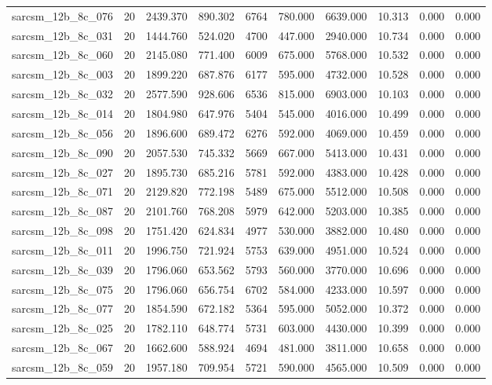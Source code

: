 \begin{tabular}{lrrrrrrrrr}
sarcsm\_12b\_8c\_076 & 20 & 2439.370 & 890.302 & 6764 & 780.000 & 6639.000 & 10.313 & 0.000 & 0.000 \\
sarcsm\_12b\_8c\_031 & 20 & 1444.760 & 524.020 & 4700 & 447.000 & 2940.000 & 10.734 & 0.000 & 0.000 \\
sarcsm\_12b\_8c\_060 & 20 & 2145.080 & 771.400 & 6009 & 675.000 & 5768.000 & 10.532 & 0.000 & 0.000 \\
sarcsm\_12b\_8c\_003 & 20 & 1899.220 & 687.876 & 6177 & 595.000 & 4732.000 & 10.528 & 0.000 & 0.000 \\
sarcsm\_12b\_8c\_032 & 20 & 2577.590 & 928.606 & 6536 & 815.000 & 6903.000 & 10.103 & 0.000 & 0.000 \\
sarcsm\_12b\_8c\_014 & 20 & 1804.980 & 647.976 & 5404 & 545.000 & 4016.000 & 10.499 & 0.000 & 0.000 \\
sarcsm\_12b\_8c\_056 & 20 & 1896.600 & 689.472 & 6276 & 592.000 & 4069.000 & 10.459 & 0.000 & 0.000 \\
sarcsm\_12b\_8c\_090 & 20 & 2057.530 & 745.332 & 5669 & 667.000 & 5413.000 & 10.431 & 0.000 & 0.000 \\
sarcsm\_12b\_8c\_027 & 20 & 1895.730 & 685.216 & 5781 & 592.000 & 4383.000 & 10.428 & 0.000 & 0.000 \\
sarcsm\_12b\_8c\_071 & 20 & 2129.820 & 772.198 & 5489 & 675.000 & 5512.000 & 10.508 & 0.000 & 0.000 \\
sarcsm\_12b\_8c\_087 & 20 & 2101.760 & 768.208 & 5979 & 642.000 & 5203.000 & 10.385 & 0.000 & 0.000 \\
sarcsm\_12b\_8c\_098 & 20 & 1751.420 & 624.834 & 4977 & 530.000 & 3882.000 & 10.480 & 0.000 & 0.000 \\
sarcsm\_12b\_8c\_011 & 20 & 1996.750 & 721.924 & 5753 & 639.000 & 4951.000 & 10.524 & 0.000 & 0.000 \\
sarcsm\_12b\_8c\_039 & 20 & 1796.060 & 653.562 & 5793 & 560.000 & 3770.000 & 10.696 & 0.000 & 0.000 \\
sarcsm\_12b\_8c\_075 & 20 & 1796.060 & 656.754 & 6702 & 584.000 & 4233.000 & 10.597 & 0.000 & 0.000 \\
sarcsm\_12b\_8c\_077 & 20 & 1854.590 & 672.182 & 5364 & 595.000 & 5052.000 & 10.372 & 0.000 & 0.000 \\
sarcsm\_12b\_8c\_025 & 20 & 1782.110 & 648.774 & 5731 & 603.000 & 4430.000 & 10.399 & 0.000 & 0.000 \\
sarcsm\_12b\_8c\_067 & 20 & 1662.600 & 588.924 & 4694 & 481.000 & 3811.000 & 10.658 & 0.000 & 0.000 \\
sarcsm\_12b\_8c\_059 & 20 & 1957.180 & 709.954 & 5721 & 590.000 & 4565.000 & 10.509 & 0.000 & 0.000 \\

\end{tabular}
